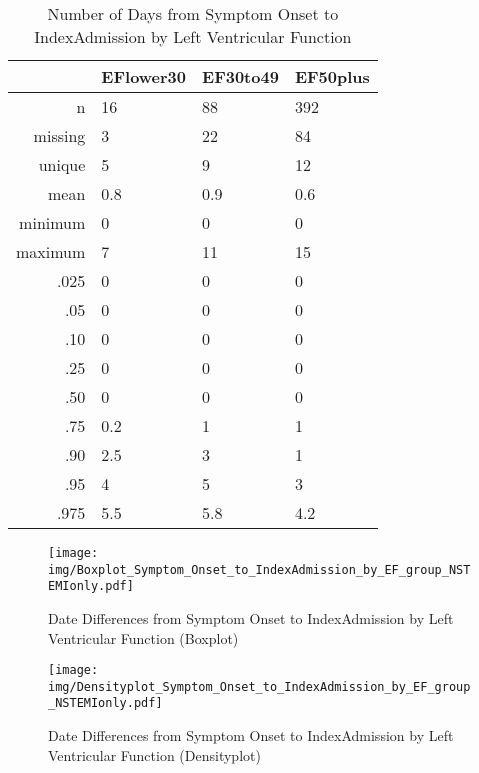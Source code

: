 \documentclass[a4paper]{report}
\begin{document}
\begin{itemize}
{%
\begin{table}[ht]
\centering
\begin{tabular}{rlll}
  \toprule
 & EFlower30 & EF30to49 & EF50plus \\ 
  \midrule
n & 16 & 88 & 392 \\ 
  missing & 3 & 22 & 84 \\ 
  unique & 5 & 9 & 12 \\ 
  mean & 0.8 & 0.9 & 0.6 \\ 
  minimum & 0 & 0 & 0 \\ 
  maximum & 7 & 11 & 15 \\ 
  .025 & 0 & 0 & 0 \\ 
  .05 & 0 & 0 & 0 \\ 
  .10 & 0 & 0 & 0 \\ 
  .25 & 0 & 0 & 0 \\ 
  .50 & 0 & 0 & 0 \\ 
  .75 & 0.2 & 1 & 1 \\ 
  .90 & 2.5 & 3 & 1 \\ 
  .95 & 4 & 5 & 3 \\ 
  .975 & 5.5 & 5.8 & 4.2 \\ 
   \bottomrule
\end{tabular}
\caption{Number of Days from Symptom Onset to IndexAdmission by Left Ventricular Function} 
\end{table}
\begin{figure}
  \centering
  \caption{Date Differences from Symptom Onset to IndexAdmission by Left Ventricular Function (Boxplot)}
  \label{Boxplot: Date Differences from Symptom Onset to IndexAdmission by Left Ventricular Function}
\texttt{[image: img/Boxplot\_Symptom\_Onset\_to\_IndexAdmission\_by\_EF\_group\_NSTEMIonly.pdf]}\end{figure}


\begin{figure}
  \centering
  \caption{Date Differences from Symptom Onset to IndexAdmission by Left Ventricular Function (Densityplot)}
  \label{Density: Date Differences from Symptom Onset to IndexAdmission by Left Ventricular Function}
\texttt{[image: img/Densityplot\_Symptom\_Onset\_to\_IndexAdmission\_by\_EF\_group\_NSTEMIonly.pdf]}\end{figure}


\clearpage

}
\end{itemize}
\end{document}
